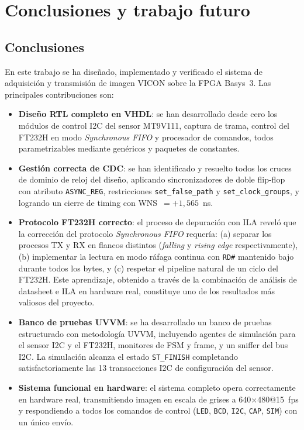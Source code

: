 \documentclass[../main.tex]{subfiles}
\begin{document}
\chapter{Conclusiones y trabajo futuro}
\label{chap:conclusiones}

\section{Conclusiones}

En este trabajo se ha diseñado, implementado y verificado el sistema de adquisición y transmisión de imagen VICON sobre la FPGA Basys~3. Las principales contribuciones son:

\begin{itemize}
    \item \textbf{Diseño RTL completo en VHDL}: se han desarrollado desde cero los módulos de control I2C del sensor MT9V111, captura de trama, control del FT232H en modo \textit{Synchronous FIFO} y procesador de comandos, todos parametrizables mediante genéricos y paquetes de constantes.

    \item \textbf{Gestión correcta de CDC}: se han identificado y resuelto todos los cruces de dominio de reloj del diseño, aplicando sincronizadores de doble flip-flop con atributo \texttt{ASYNC\_REG}, restricciones \texttt{set\_false\_path} y \texttt{set\_clock\_groups}, y logrando un cierre de timing con WNS~$= +1{,}565$~ns.

    \item \textbf{Protocolo FT232H correcto}: el proceso de depuración con ILA reveló que la corrección del protocolo \textit{Synchronous FIFO} requería: (a) separar los procesos TX y RX en flancos distintos (\textit{falling} y \textit{rising edge} respectivamente), (b) implementar la lectura en modo ráfaga continua con \texttt{RD\#} mantenido bajo durante todos los bytes, y (c) respetar el pipeline natural de un ciclo del FT232H. Este aprendizaje, obtenido a través de la combinación de análisis de datasheet e ILA en hardware real, constituye uno de los resultados más valiosos del proyecto.

    \item \textbf{Banco de pruebas UVVM}: se ha desarrollado un banco de pruebas estructurado con metodología UVVM, incluyendo agentes de simulación para el sensor I2C y el FT232H, monitores de FSM y frame, y un sniffer del bus I2C. La simulación alcanza el estado \texttt{ST\_FINISH} completando satisfactoriamente las 13 transacciones I2C de configuración del sensor.

    \item \textbf{Sistema funcional en hardware}: el sistema completo opera correctamente en hardware real, transmitiendo imagen en escala de grises a 640$\times$480@15~fps y respondiendo a todos los comandos de control (\texttt{LED}, \texttt{BCD}, \texttt{I2C}, \texttt{CAP}, \texttt{SIM}) con un único envío.
\end{itemize}
\end{document}
